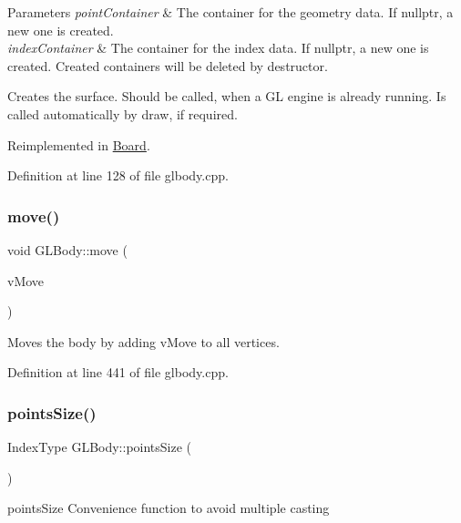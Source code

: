 \begin{DoxyParams}{Parameters}
{\em point\+Container} & The container for the geometry data. If nullptr, a new one is created. \\
\hline
{\em index\+Container} & The container for the index data. If nullptr, a new one is created. Created containers will be deleted by destructor.\\
\hline
\end{DoxyParams}
Creates the surface. Should be called, when a GL engine is already running. Is called automatically by draw, if required. 

Reimplemented in \mbox{\hyperlink{class_board_a4a8568ce7d13db61b01e6bf14e7b12fd}{Board}}.



Definition at line 128 of file glbody.\+cpp.

\mbox{\label{class_g_l_body_aa716fdbc46e14434e28b893dad1b87f1}} 
\subsubsection{\texorpdfstring{move()}{move()}}
{\footnotesize\ttfamily void G\+L\+Body\+::move (\begin{DoxyParamCaption}\item[{Q\+Vector3D}]{v\+Move }\end{DoxyParamCaption})}

Moves the body by adding v\+Move to all vertices. 

Definition at line 441 of file glbody.\+cpp.

\mbox{\label{class_g_l_body_ab49318c0af2044a32ec6e7833a6224c1}} 
\subsubsection{\texorpdfstring{pointsSize()}{pointsSize()}}
{\footnotesize\ttfamily Index\+Type G\+L\+Body\+::points\+Size (\begin{DoxyParamCaption}{ }\end{DoxyParamCaption})\hspace{0.3cm}{\ttfamily [inline]}}



points\+Size Convenience function to avoid multiple casting 

